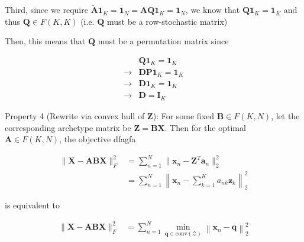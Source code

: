 \documentclass[oneside]{article}
\begin{document}
Third, since we require $\tilde{\mathbf{A}} \mathbf{1}_K = \mathbf{1}_N = \mathbf{A} \mathbf{Q} \mathbf{1}_K = \mathbf{1}_N$, we know that $\mathbf{Q} \mathbf{1}_K = \mathbf{1}_K$ and thus $\mathbf{Q} \in F(K, K)$ (i.e. $\mathbf{Q}$ must be a row-stochastic matrix)

Then, this means that $\mathbf{Q}$ must be a permutation matrix since 

\begin{equation}
    \begin{aligned}
        &\mathbf{Q} \mathbf{1}_K = \mathbf{1}_K \\
        \rightarrow &\mathbf{D} \mathbf{P} \mathbf{1}_K = \mathbf{1}_K \\
        \rightarrow &\mathbf{D} \mathbf{1}_K = \mathbf{1}_K \\
        \rightarrow &\mathbf{D} = \mathbf{I}_K
    \end{aligned}
\end{equation}


Property 4 (Rewrite via convex hull of $\mathbf{Z}$): For some fixed $\mathbf{B} \in F(K, N)$, let the corresponding archetype matrix be $\mathbf{Z} = \mathbf{B} \mathbf{X}$. Then for the optimal $\mathbf{A} \in F(K, N)$, the objective  dfagfa

\begin{equation}
    \begin{aligned}
    \| \mathbf{X} - \mathbf{A} \mathbf{B} \mathbf{X} \|_F^2 
    &= \sum_{n=1}^N \| \mathbf{x}_n - \mathbf{Z}^T \mathbf{a}_n \|_2^2 \\
    &= \sum_{n=1}^N \left\| \mathbf{x}_n - \sum_{k=1}^K a_{nk} \mathbf{z}_k \right\|_2^2
    \end{aligned}
\end{equation}

is equivalent to

\begin{equation}
    \begin{aligned}
    \| \mathbf{X} - \mathbf{A} \mathbf{B} \mathbf{X} \|_F^2 
    &= \sum_{n=1}^N \min_{\mathbf{q} \in \text{conv}(\mathcal{Z})} \left\| \mathbf{x}_n - \mathbf{q} \right\|_2^2
    \end{aligned}
\end{equation}
\end{document}
